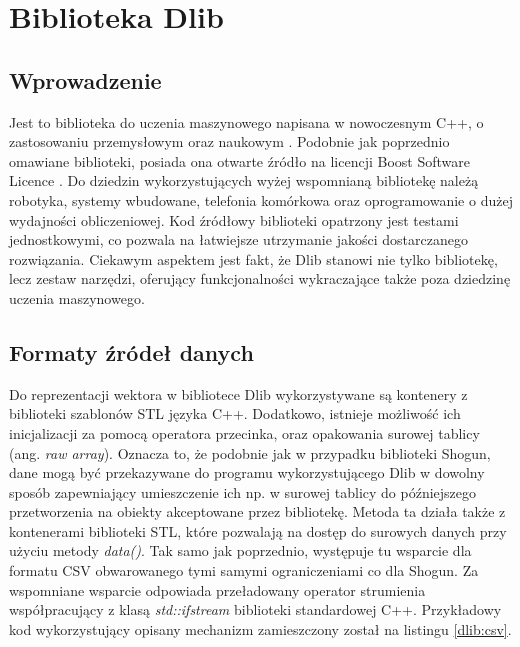 \chapter{Biblioteka Dlib}

\section{Wprowadzenie}

Jest to biblioteka do uczenia maszynowego napisana w nowoczesnym C++, o zastosowaniu przemysłowym oraz naukowym \cite{Dlib09}. Podobnie jak poprzednio omawiane biblioteki, posiada ona otwarte źródło na licencji Boost Software Licence \cite{dlib:license}. Do dziedzin wykorzystujących wyżej wspomnianą bibliotekę należą robotyka, systemy wbudowane, telefonia komórkowa oraz oprogramowanie o dużej wydajności obliczeniowej. Kod źródłowy biblioteki opatrzony jest testami jednostkowymi, co pozwala na łatwiejsze utrzymanie jakości dostarczanego rozwiązania. Ciekawym aspektem jest fakt, że Dlib stanowi nie tylko bibliotekę, lecz zestaw narzędzi, oferujący funkcjonalności wykraczające także poza dziedzinę uczenia maszynowego.

\section{Formaty źródeł danych}

Do reprezentacji wektora w bibliotece Dlib wykorzystywane są kontenery z biblioteki szablonów STL języka C++. Dodatkowo, istnieje możliwość ich inicjalizacji za pomocą operatora przecinka, oraz opakowania surowej tablicy (ang. \textit{raw array}). Oznacza to, że podobnie jak w przypadku biblioteki Shogun, dane mogą być przekazywane do programu wykorzystującego Dlib w dowolny sposób zapewniający umieszczenie ich np. w surowej tablicy do późniejszego przetworzenia na obiekty akceptowane przez bibliotekę. Metoda ta działa także z kontenerami biblioteki STL, które pozwalają na dostęp do surowych danych przy użyciu metody \textit{data()}. Tak samo jak poprzednio, występuje tu wsparcie dla formatu CSV obwarowanego tymi samymi ograniczeniami co dla Shogun. Za wspomniane wsparcie odpowiada przeładowany operator strumienia współpracujący z klasą \textit{std::ifstream} biblioteki standardowej C++. Przykładowy kod wykorzystujący opisany mechanizm zamieszczony został na listingu \ref{dlib:csv}.


